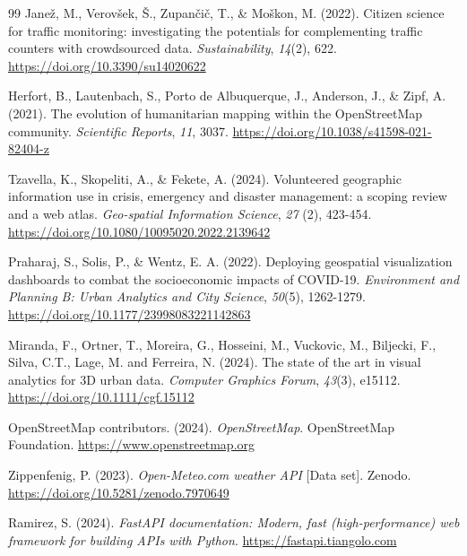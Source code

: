 \documentclass[12pt,a4paper]{report}
\begin{document}
\begin{thebibliography}{99}
Jane\v{z}, M., Verov\v{s}ek, \v{S}., Zupan\v{c}i\v{c}, T., \&
Mo\v{s}kon, M. (2022). Citizen science for traffic monitoring:
investigating the potentials for complementing traffic counters with
crowdsourced data. \textit{Sustainability}, \textit{14}(2), 622.
\href{https://doi.org/10.3390/su14020622}
{https://doi.org/10.3390/su14020622}

Herfort, B., Lautenbach, S., Porto de Albuquerque, J., Anderson, J.,
\& Zipf, A. (2021). The evolution of humanitarian mapping within the
OpenStreetMap community. \textit{Scientific Reports}, \textit{11},
3037.
\href{https://doi.org/10.1038/s41598-021-82404-z}
{https://doi.org/10.1038/s41598-021-82404-z}

Tzavella, K., Skopeliti, A., \& Fekete, A. (2024). Volunteered geographic
information use in crisis, emergency and disaster management: a scoping
review and a web atlas. \textit{Geo-spatial Information Science},
\textit{27} (2), 423-454.
\href{https://doi.org/10.1080/10095020.2022.2139642}
{https://doi.org/10.1080/10095020.2022.2139642}

Praharaj, S., Solis, P., \& Wentz, E. A. (2022). Deploying geospatial visualization
dashboards to combat the socioeconomic impacts of COVID-19.
\textit{Environment and Planning B: Urban Analytics and City Science},
\textit{50}(5), 1262-1279.
\href{https://doi.org/10.1177/23998083221142863}
{https://doi.org/10.1177/23998083221142863}

Miranda, F., Ortner, T., Moreira, G., Hosseini, M., Vuckovic, M., Biljecki, F., Silva, C.T., Lage, M. and Ferreira, N. (2024). The state of the art in visual
analytics for 3D urban data. \textit{Computer Graphics Forum},
\textit{43}(3), e15112.
\href{https://doi.org/10.1111/cgf.15112}
{https://doi.org/10.1111/cgf.15112}

OpenStreetMap contributors. (2024). \textit{OpenStreetMap}.
OpenStreetMap Foundation.
\href{https://www.openstreetmap.org}{https://www.openstreetmap.org}

Zippenfenig, P. (2023). \textit{Open-Meteo.com weather API} [Data
set]. Zenodo.
\href{https://doi.org/10.5281/zenodo.7970649}
{https://doi.org/10.5281/zenodo.7970649}

Ramirez, S. (2024). \textit{FastAPI documentation: Modern, fast
(high-performance) web framework for building APIs with Python}.
\href{https://fastapi.tiangolo.com}{https://fastapi.tiangolo.com}



\end{thebibliography}
\end{document}
